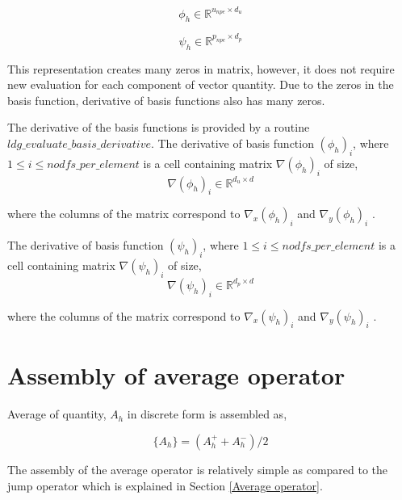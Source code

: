 \documentclass[a4paper,12pt]{book}
\begin{document}
\begin{equation}\label{basis_func_velocity_rbmatlab}
\phi_h \in \mathbb{R}^{u_{npe} \times d_u}
\end{equation}

\begin{equation}\label{basis_func_pressure_rbmatlab}
\psi_h \in \mathbb{R}^{p_{npe} \times d_p}
\end{equation}

This representation creates many zeros in matrix, however, it does not require new evaluation for each component of vector quantity. Due to the zeros in the basis function, derivative of basis functions also has many zeros.

The derivative of the basis functions is provided by a routine $ldg\_evaluate\_basis\_derivative$. The derivative of basis function $(\phi_h)_{i}$, where $1 \leq i \leq nodfs\_per\_element$ is a cell containing matrix $\nabla (\phi_h)_{i}$ of size,
\begin{equation}\label{basis_func_derivative_velocity_rbmatlab}
\nabla (\phi_h)_{i} \in \mathbb{R}^{{d_u} \times d}
\end{equation}

where the columns of the matrix correspond to $\nabla_x (\phi_h)_{i}$ and $\nabla_y (\phi_h)_{i}$ .

The derivative of basis function $(\psi_h)_{i}$, where $1 \leq i \leq nodfs\_per\_element$ is a cell containing matrix $\nabla (\psi_h)_{i}$ of size,
\begin{equation}\label{basis_func_derivative_pressure_rbmatlab}
\nabla (\psi_h)_{i} \in \mathbb{R}^{{d_p} \times d}
\end{equation}

where the columns of the matrix correspond to $\nabla_x (\psi_h)_{i}$ and $\nabla_y (\psi_h)_{i}$ .

\section{Assembly of average operator}

Average of quantity, $A_h$ in discrete form is assembled as,

\begin{equation}\label{Average operator}
\lbrace A_h \rbrace = (A_h^+ + A_h^-)/2
\end{equation}

The assembly of the average operator is relatively simple as compared to the jump operator which is explained in Section \ref{Average operator}.
\end{document}
